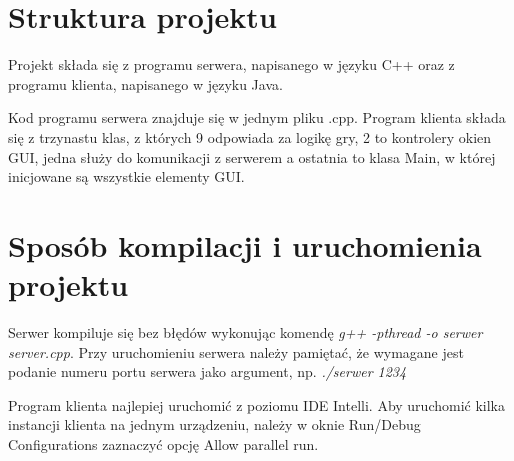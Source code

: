 \documentclass[a4paper]{article}
\begin{document}
\section{Struktura projektu}
    Projekt składa się z programu serwera, napisanego w języku C++ oraz z programu klienta, napisanego w języku Java.

	Kod programu serwera znajduje się w jednym pliku .cpp. Program klienta składa się z trzynastu klas, z których 9 odpowiada za logikę gry, 2 to kontrolery okien GUI, jedna służy do komunikacji z serwerem a ostatnia to klasa Main, w której inicjowane są wszystkie elementy GUI. 
    
\section{Sposób kompilacji i uruchomienia projektu}
	Serwer kompiluje się bez błędów wykonując komendę \textit{g++ -pthread -o serwer server.cpp}. Przy uruchomieniu serwera należy pamiętać, że wymagane jest podanie numeru portu serwera jako argument, np. \textit{./serwer 1234}
	
	Program klienta najlepiej uruchomić z poziomu IDE Intelli. Aby uruchomić kilka instancji klienta na jednym urządzeniu, należy w oknie Run/Debug Configurations zaznaczyć opcję Allow parallel run.
\end{document}
